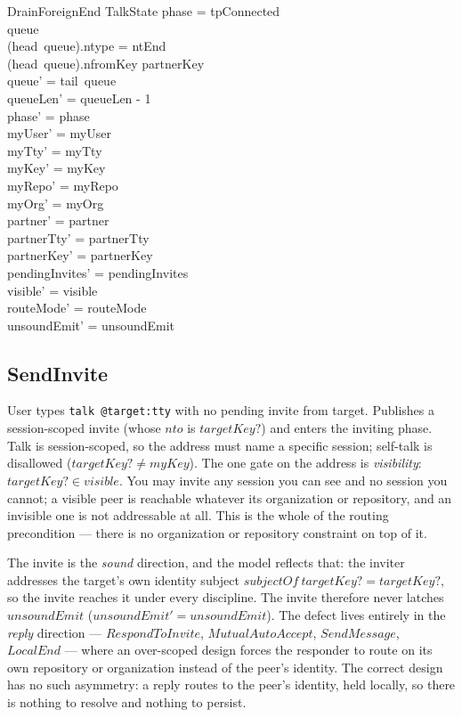 \documentclass[a4paper,10pt,fleqn]{article}
\begin{document}
\begin{schema}{DrainForeignEnd}
  \Delta TalkState
\where
  phase = tpConnected \\
  queue \neq \langle \rangle \\
  (head~queue).ntype = ntEnd \\
  (head~queue).nfromKey \neq partnerKey \\
  queue' = tail~queue \\
  queueLen' = queueLen - 1 \\
  phase' = phase \\
  myUser' = myUser \\
  myTty' = myTty \\
  myKey' = myKey \\
  myRepo' = myRepo \\
  myOrg' = myOrg \\
  partner' = partner \\
  partnerTty' = partnerTty \\
  partnerKey' = partnerKey \\
  pendingInvites' = pendingInvites \\
  visible' = visible \\
  routeMode' = routeMode \\
  unsoundEmit' = unsoundEmit
\end{schema}

\subsection{SendInvite}

User types \texttt{talk @target:tty} with no pending invite from
target.  Publishes a session-scoped invite (whose $nto$ is
$targetKey?$) and enters the inviting phase.  Talk is session-scoped,
so the address must name a specific session; self-talk is disallowed
($targetKey? \neq myKey$).  The one gate on the address is
\emph{visibility}: $targetKey? \in visible$.  You may invite any session
you can see and no session you cannot; a visible peer is reachable
whatever its organization or repository, and an invisible one is not
addressable at all.  This is the whole of the routing precondition ---
there is no organization or repository constraint on top of it.

The invite is the \emph{sound} direction, and the model reflects that:
the inviter addresses the target's own identity subject $subjectOf~
targetKey? = targetKey?$, so the invite reaches it under every
discipline.  The invite therefore never latches $unsoundEmit$
($unsoundEmit' = unsoundEmit$).  The defect lives entirely in the
\emph{reply} direction --- $RespondToInvite$, $MutualAutoAccept$,
$SendMessage$, $LocalEnd$ --- where an over-scoped design forces the
responder to route on its own repository or organization instead of the
peer's identity.  The correct design has no such asymmetry: a reply
routes to the peer's identity, held locally, so there is nothing to
resolve and nothing to persist.
\end{document}
